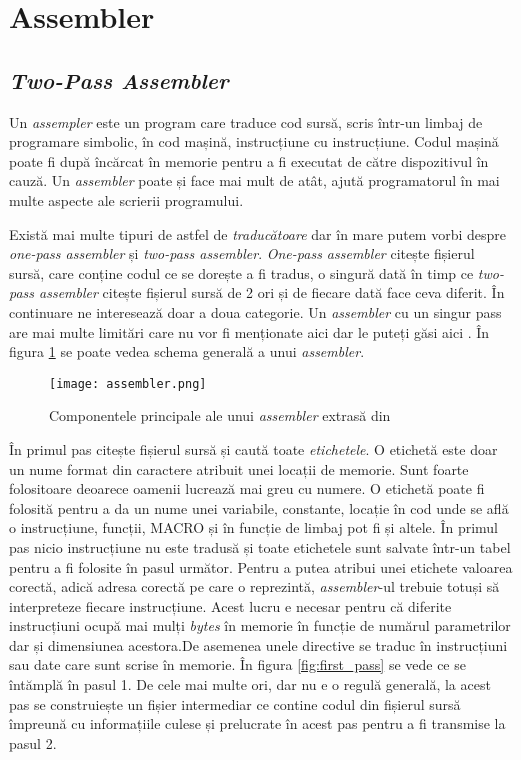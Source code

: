 \documentclass[../main.tex]{subfiles}
\begin{document}
\section{Assembler}
\subsection{\emph{Two-Pass Assembler}}
Un \emph{assempler} este un program care traduce cod sursă, scris într-un limbaj de programare simbolic, în cod mașină,
instrucțiune cu instrucțiune. Codul mașină poate fi după încărcat în memorie pentru a fi executat de către dispozitivul
în cauză. Un \emph{assembler} poate și face mai mult de atât, ajută programatorul în mai multe aspecte ale scrierii
programului.

Există mai multe tipuri de astfel de \emph{traducătoare} dar în mare putem vorbi despre \emph{one-pass assembler} și
\emph{two-pass assembler}. \emph{One-pass assembler} citește fișierul sursă, care conține codul ce se dorește a fi
tradus, o singură dată în timp ce \emph{two-pass assembler} citește fișierul sursă de 2 ori și de fiecare dată face
ceva diferit. În continuare ne interesează doar a doua categorie. Un \emph{assembler} cu un singur pass are mai multe
limitări care nu vor fi menționate aici dar le puteți găsi aici \cite{asl}. În figura \ref{fig:assembler} se poate 
vedea schema generală a unui \emph{assembler}.

\begin{figure}[h]
    \centering
    \texttt{[image: assembler.png]}
    \caption{Componentele principale ale unui \emph{assembler} extrasă din \cite{asl}}
    \label{fig:assembler}
\end{figure}

În primul pas citește fișierul sursă și caută toate \emph{etichetele}. O etichetă este doar un nume format din caractere
atribuit unei locații de memorie. Sunt foarte folositoare deoarece oamenii lucrează mai greu cu numere. O etichetă poate
fi folosită pentru a da un nume unei variabile, constante, locație în cod unde se află o instrucțiune, funcții, MACRO
și în funcție de limbaj pot fi și altele. În primul pas nicio instrucțiune nu este tradusă și toate etichetele sunt
salvate într-un tabel pentru a fi folosite în pasul următor. Pentru a putea atribui unei etichete valoarea corectă,
adică adresa corectă pe care o reprezintă, \emph{assembler}-ul trebuie totuși să interpreteze fiecare instrucțiune.
Acest lucru e necesar pentru că diferite instrucțiuni ocupă mai mulți \emph{bytes} în memorie în funcție de numărul
parametrilor dar și dimensiunea acestora.De asemenea unele directive se traduc în instrucțiuni sau date care sunt scrise
în memorie. În figura \ref{fig:first_pass} se vede ce se întămplă în pasul 1.
De cele mai multe ori, dar nu e o regulă generală, la acest pas se construiește un fișier intermediar ce
contine codul din fișierul sursă împreună cu informațiile culese și prelucrate în acest pas pentru a fi transmise la
pasul 2.
\end{document}
